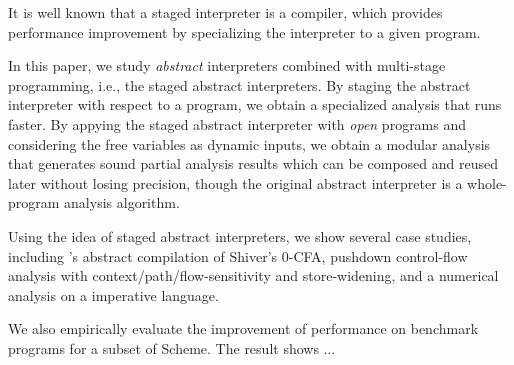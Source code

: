 It is well known that a staged interpreter is a compiler, which provides performance improvement
by specializing the interpreter to a given program.

In this paper, we study \textit{abstract} interpreters combined with multi-stage programming, i.e., the 
staged abstract interpreters. 
By staging the abstract interpreter with respect to a program, we obtain a specialized analysis that runs faster.
By appying the staged abstract interpreter with \textit{open} programs and considering the free variables as dynamic inputs, 
we obtain a modular analysis that generates sound partial analysis results which can be composed 
and reused later without losing precision, though the original abstract interpreter is a whole-program 
analysis algorithm.

Using the idea of staged abstract interpreters, we show several case studies, including 
\citeauthor{Boucher:1996:ACN:647473.727587}'s abstract compilation of Shiver's 0-CFA, pushdown
control-flow analysis with context/path/flow-sensitivity and store-widening, and a numerical
analysis on a imperative language.

We also empirically evaluate the improvement of performance on benchmark programs for a subset of Scheme.
The result shows ...

